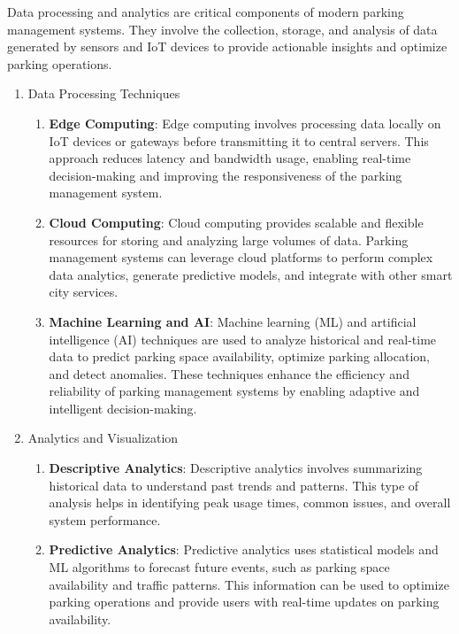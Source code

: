 \documentclass[oneside, 12pt, a4paper, draft]{book}
\begin{document}
Data processing and analytics are critical components of modern parking management systems. They involve the collection, storage, and analysis of data generated by sensors and IoT devices to provide actionable insights and optimize parking operations.
\begin{enumerate}
\item Data Processing Techniques
\label{sec:org933d77f}

\begin{enumerate}
\item \textbf{Edge Computing}: Edge computing involves processing data locally on IoT devices or gateways before transmitting it to central servers. This approach reduces latency and bandwidth usage, enabling real-time decision-making and improving the responsiveness of the parking management system.

\item \textbf{Cloud Computing}: Cloud computing provides scalable and flexible resources for storing and analyzing large volumes of data. Parking management systems can leverage cloud platforms to perform complex data analytics, generate predictive models, and integrate with other smart city services.

\item \textbf{Machine Learning and AI}: Machine learning (ML) and artificial intelligence (AI) techniques are used to analyze historical and real-time data to predict parking space availability, optimize parking allocation, and detect anomalies. These techniques enhance the efficiency and reliability of parking management systems by enabling adaptive and intelligent decision-making.
\end{enumerate}
\item Analytics and Visualization
\label{sec:orgf9c8653}

\begin{enumerate}
\item \textbf{Descriptive Analytics}: Descriptive analytics involves summarizing historical data to understand past trends and patterns. This type of analysis helps in identifying peak usage times, common issues, and overall system performance.

\item \textbf{Predictive Analytics}: Predictive analytics uses statistical models and ML algorithms to forecast future events, such as parking space availability and traffic patterns. This information can be used to optimize parking operations and provide users with real-time updates on parking availability.


\end{enumerate}
\end{enumerate}
\end{document}
